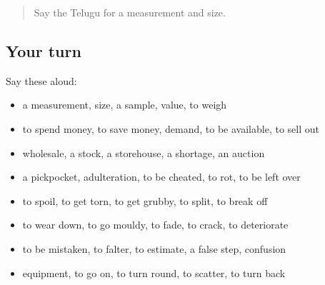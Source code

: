 \label{lesson:TE-R493-review-486-493}



\begin{quote}
Say the Telugu for a measurement and size.
\end{quote}

\subsection*{Your turn}
Say these aloud:

\begin{itemize}
\raggedright
  \item a measurement, size, a sample, value, to weigh
  \item to spend money, to save money, demand, to be available, to sell out
  \item wholesale, a stock, a storehouse, a shortage, an auction
  \item a pickpocket, adulteration, to be cheated, to rot, to be left over
  \item to spoil, to get torn, to get grubby, to split, to break off
  \item to wear down, to go mouldy, to fade, to crack, to deteriorate
  \item to be mistaken, to falter, to estimate, a false step, confusion
  \item equipment, to go on, to turn round, to scatter, to turn back
\end{itemize}


